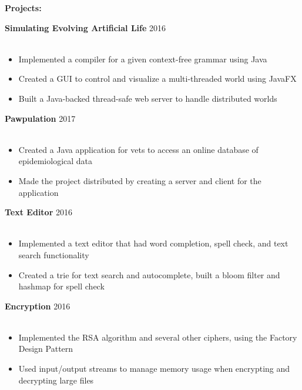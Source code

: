 \documentclass[12pt]{article}
\newcommand{\group}[1]{
	\fontsize{14}{0} \selectfont
	\textbf{#1}
}
\newcommand{\jobCaption}[2]{
	\hspace{0.3em}
	\fontsize{12}{13} \selectfont
	\textbf{#1}
	\fontsize{11}{12} \selectfont 
	\hfill{#2}\\[.1em]
}
\begin{document}
	\vspace{1em}

\group{Projects:}
	\vspace{.4em}

\jobCaption{Simulating Evolving Artificial Life}{2016}\\[-1.75em]
	\begin{itemize}[leftmargin=1.5cm]
		\setlength\itemsep{-.25em}
		\fontsize{11}{0} \selectfont 
		\item Implemented a compiler for a given context-free grammar using Java 
		\item Created a GUI to control and visualize a multi-threaded world using JavaFX
		\item Built a Java-backed thread-safe web server to handle distributed worlds
		
	\end{itemize}
	\vspace{.7em}
	
	\jobCaption{Pawpulation}{2017}\\[-1.75em]
	\begin{itemize}[leftmargin=1.5cm]
		\setlength\itemsep{-.25em}
		\fontsize{11}{0} \selectfont 
		 
	\item Created a Java application for vets to access an online database of epidemiological data
\item Made the project distributed by creating a server and client for the application
	
	\end{itemize}
	\vspace{.7em}
	
	\jobCaption{Text Editor}{2016}\\[-1.75em]
	\begin{itemize}[leftmargin=1.5cm]
		\setlength\itemsep{-.25em}
		\fontsize{11}{0} \selectfont 
		
\item Implemented a text editor that had word completion, spell check, and text search functionality
\item Created a trie for text search and autocomplete, built a bloom filter and hashmap for spell check
	
	\end{itemize}
	\vspace{.7em}
	
	\jobCaption{Encryption}{2016}\\[-1.75em]
	\begin{itemize}[leftmargin=1.5cm]
		\setlength\itemsep{-.25em}
		\fontsize{11}{0} \selectfont 
		
	\item Implemented the RSA algorithm and several other ciphers, using the Factory Design Pattern  
\item Used input/output streams to manage memory usage when encrypting and decrypting large files
	\end{itemize}
	\vspace{.7em}
\end{document}
